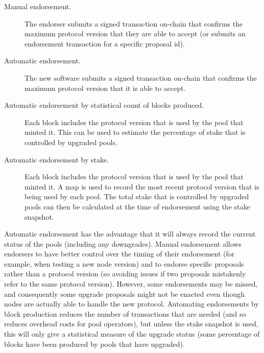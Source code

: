 \begin{description}
\item
  [Manual endorsement.]  The endorser submits a signed transaction on-chain that confirms the maximum protocol version that they are
  able to accept (or submits an endorsement transaction for a specific proposal id).
\item
  [Automatic endorsement.]  The new software submits a signed transaction on-chain that confirms the maximum protocol version that it is
  able to accept.
\item
  [Automatic endorsement by statistical count of blocks produced.]  Each block includes the protocol version that is used by the pool that minted it.  This can be used to
  estimate the percentage of stake that is controlled by upgraded pools.
\item
  [Automatic endorsement by stake.]  Each block includes the protocol version that is used by the pool that minted it.  A map is used
  to record the most recent protocol version that is being used by each pool.  The total stake that is controlled by upgraded pools can then
  be calculated at the time of endorsement using the stake snapshot.
\end{description}

Automatic endorsement has the advantage that it will always record the current
status of the pools (including any downgrades).
Manual endorsement allows endorsers to have better control over
the timing of their endorsement (for example, when testing a new node version)
and to endorse specific proposals rather than a protocol version (so avoiding issues if two proposals
mistakenly refer to the same protocol version).  However, some
endorsements may be missed, and consequently some upgrade proposals might not be enacted
even though nodes are actually able to handle the new protocol.
Automating endorsements by block production reduces the number of transactions that are needed (and so reduces overhead costs for pool operators),
but unless the stake snapshot is used, this will only give a statistical measure of the upgrade status (some percentage of blocks have been produced by
pools that have upgraded).

